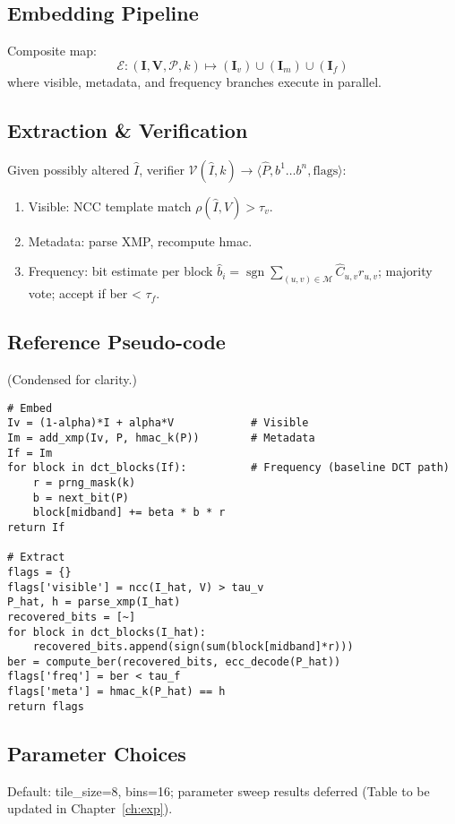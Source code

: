 \subsection{Embedding Pipeline}\label{subsec:embedding-pipeline}
Composite map:
\begin{equation}
  \label{eq:embed}
  \mathcal E: (\mathbf I, \mathbf V, \mathcal P, k) \mapsto (\mathbf I_v) \cup (\mathbf I_m) \cup (\mathbf I_f)
\end{equation}
where visible, metadata, and frequency branches execute in parallel.

\subsection{Extraction \& Verification}\label{subsec:extraction-&-verification}
Given possibly altered $\hat I$, verifier $\mathcal V(\hat I,k) \to \langle \hat P, b^1\dots b^n, \text{flags}\rangle$:
\begin{enumerate}
  \item Visible: NCC template match $\rho(\hat I, V) > \tau_v$.
  \item Metadata: parse XMP, recompute \gls{hmac}.
  \item Frequency: bit estimate per block $\hat b_i = \operatorname{sgn}\sum_{(u,v)\in\mathcal M} \hat C_{u,v} r_{u,v}$; majority vote; accept if \gls{ber} < $\tau_f$.
\end{enumerate}

\subsection{Reference Pseudo-code}
(Condensed for clarity.)\label{subsec:reference-pseudo-code}
\begin{verbatim}
# Embed
Iv = (1-alpha)*I + alpha*V            # Visible
Im = add_xmp(Iv, P, hmac_k(P))        # Metadata
If = Im
for block in dct_blocks(If):          # Frequency (baseline DCT path)
    r = prng_mask(k)
    b = next_bit(P)
    block[midband] += beta * b * r
return If

# Extract
flags = {}
flags['visible'] = ncc(I_hat, V) > tau_v
P_hat, h = parse_xmp(I_hat)
recovered_bits = [~]
for block in dct_blocks(I_hat):
    recovered_bits.append(sign(sum(block[midband]*r)))
ber = compute_ber(recovered_bits, ecc_decode(P_hat))
flags['freq'] = ber < tau_f
flags['meta'] = hmac_k(P_hat) == h
return flags
\end{verbatim}

\subsection{Parameter Choices}\label{subsec:parameter-choices}
Default: tile\_size=8, bins=16; parameter sweep results deferred (Table to be updated in Chapter~\ref{ch:exp}).

